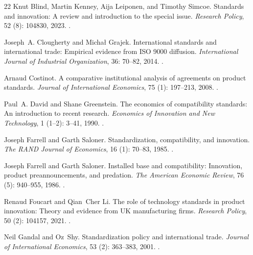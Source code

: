 \documentclass[sn-mathphys-ay]{sn-jnl}
\theoremstyle{plain}
\theoremstyle{remark}
\begin{document}
\begin{thebibliography}{22}
Knut Blind, Martin Kenney, Aija Leiponen, and Timothy Simcoe.
\newblock Standards and innovation: A review and introduction to the special
  issue.
\newblock \emph{Research Policy}, 52 (8): 104830, 2023.
\newblock {}.

Joseph~A. Clougherty and Micha{\l} Grajek.
\newblock International standards and international trade: Empirical evidence
  from {ISO} 9000 diffusion.
\newblock \emph{International Journal of Industrial Organization}, 36:
  70--82, 2014.
\newblock {}.

Arnaud Costinot.
\newblock A comparative institutional analysis of agreements on product
  standards.
\newblock \emph{Journal of International Economics}, 75 (1):
  197--213, 2008.
\newblock {}.

Paul~A. David and Shane Greenstein.
\newblock The economics of compatibility standards: An introduction to recent
  research.
\newblock \emph{Economics of Innovation and New Technology}, 1
  (1--2): 3--41, 1990.
\newblock {}.

Joseph Farrell and Garth Saloner.
\newblock Standardization, compatibility, and innovation.
\newblock \emph{The RAND Journal of Economics}, 16 (1):
  70--83, 1985.
\newblock {}.

Joseph Farrell and Garth Saloner.
\newblock Installed base and compatibility: Innovation, product
  preannouncements, and predation.
\newblock \emph{The American Economic Review}, 76 (5):
  940--955, 1986.
\newblock {}.

Renaud Foucart and Qian~Cher Li.
\newblock The role of technology standards in product innovation: Theory and
  evidence from {UK} manufacturing firms.
\newblock \emph{Research Policy}, 50 (2): 104157, 2021.
\newblock {}.

Neil Gandal and Oz~Shy.
\newblock Standardization policy and international trade.
\newblock \emph{Journal of International Economics}, 53 (2):
  363--383, 2001.
\newblock {}.


\end{thebibliography}
\end{document}
